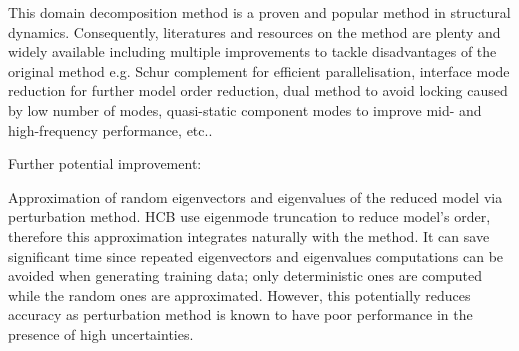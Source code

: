 \documentclass[a4paper,oneside,10pt]{article}
\begin{document}
\begin{singlespace}
This domain decomposition method is a proven and popular method in structural dynamics.
Consequently, literatures and resources on the method are plenty and widely available including multiple improvements to tackle disadvantages of the original method e.g. Schur complement for efficient parallelisation, interface mode reduction for further model order reduction, dual method to avoid locking caused by low number of modes, quasi-static component modes to improve mid- and high-frequency performance, etc..
\vspace{10pt} 

Further potential improvement: 
\vspace{10pt} 

Approximation of random eigenvectors and eigenvalues of the reduced model via perturbation method. 
HCB use eigenmode truncation to reduce model's order, therefore this approximation integrates naturally with the method. 
It can save significant time since repeated eigenvectors and eigenvalues computations can be avoided when generating training data; only deterministic ones are computed while the random ones are approximated. 
However, this potentially reduces accuracy as perturbation method is known to have poor performance in the presence of high uncertainties. 
\end{singlespace}



\newpage
 
 
% 
% 
% 
%
%
%
% 

%

\newpage 
\printbibliography
\end{document}
